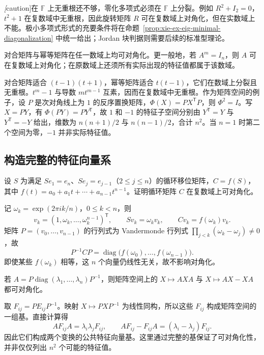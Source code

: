 \emph[caution]{在 $\mathbb F$ 上无重根还不够，零化多项式必须在 $\mathbb F$ 上分裂。}例如 $R^2+I_2=0$，$t^2+1$ 在复数域中无重根，因此旋转矩阵 $R$ 可在复数域上对角化，但在实数域上不能。极小多项式形式的充要条件将在命题~\ref{prop:xie-ex-eig-minimal-diagonalization} 中统一给出；Jordan 块判据则需要后续的标准型理论。

\begin{example}
对合矩阵与幂等矩阵在任一数域上均可对角化。更一般地，若 $A^m=I_n$，则 $A$ 可在复数域上对角化；在原数域上还须所有实际出现的特征值都属于该数域。
\end{example}
\begin{solve}
对合矩阵适合 $(t-1)(t+1)$，幂等矩阵适合 $t(t-1)$，它们在数域上分裂且无重根。$t^m-1$ 与导数 $mt^{m-1}$ 互素，因而在复数域中无重根。作为矩阵空间的例子，设 $P$ 是次对角线上为 $1$ 的反序置换矩阵，$\Phi(X)=PX^{\mathsf T}P$，则 $\Phi^2=I$。写 $X=PY$，有 $\Phi(PY)=PY^{\mathsf T}$，故 $1$ 和 $-1$ 的特征子空间分别由 $Y^{\mathsf T}=Y$ 与 $Y^{\mathsf T}=-Y$ 给出，维数为 $n(n+1)/2$ 与 $n(n-1)/2$，合计 $n^2$。当 $n=1$ 时第二个空间为零，$-1$ 并非实际特征值。
\end{solve}

\subsection{构造完整的特征向量系}

\begin{example}
设 $S$ 为满足 $Se_1=e_n$、$Se_j=e_{j-1}$（$2\le j\le n$）的循环移位矩阵，$C=f(S)$，其中 $f(t)=a_0+a_1t+\cdots+a_{n-1}t^{n-1}$。证明循环矩阵 $C$ 在复数域上可对角化。
\end{example}
\begin{solve}
记 $\omega_k=\exp(2\pi i k/n)$，$0\le k<n$，则
\[
v_k=(1,\omega_k,\ldots,\omega_k^{n-1})^{\mathsf T},\qquad
Sv_k=\omega_kv_k,\qquad Cv_k=f(\omega_k)v_k.
\]
矩阵 $P=(v_0,\ldots,v_{n-1})$ 的行列式为 Vandermonde 行列式 $\prod_{j<k}(\omega_k-\omega_j)\ne0$，故
\[
P^{-1}CP=\operatorname{diag}\bigl(f(\omega_0),\ldots,f(\omega_{n-1})\bigr).
\]
即使某些 $f(\omega_k)$ 相等，这 $n$ 个向量仍线性无关，故不影响对角化。
\end{solve}

\begin{example}
若 $A=P\operatorname{diag}(\lambda_1,\ldots,\lambda_n)P^{-1}$，则矩阵空间上的 $X\mapsto AXA$ 与 $X\mapsto AX-XA$ 都可对角化。
\end{example}
\begin{solve}
取 $F_{ij}=PE_{ij}P^{-1}$。映射 $X\mapsto PXP^{-1}$ 为线性同构，所以这些 $F_{ij}$ 构成矩阵空间的一组基。直接计算得
\[
AF_{ij}A=\lambda_i\lambda_jF_{ij},\qquad
AF_{ij}-F_{ij}A=(\lambda_i-\lambda_j)F_{ij}.
\]
因此它们构成两个变换的公共特征向量基。这里通过完整的基保证了可对角化性，并非仅仅列出 $n^2$ 个可能的特征值。
\end{solve}

